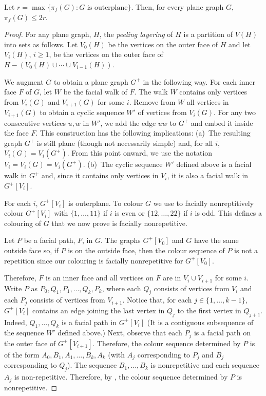 \documentclass{patmorin}
\begin{document}
\begin{thm}
   Let $r=\max\{\pi_f(G):\text{$G$ is outerplane}\}$.  Then, for every
   plane graph $G$, $\pi_f(G)\le 2r$.
\end{thm}

\begin{proof}
   For any plane graph, $H$, the \emph{peeling layering} of $H$ is
   a partition of $V(H)$ into sets as follows.  Let $V_0(H)$ be the
   vertices on the outer face of $H$ and let $V_i(H)$, $i\ge 1$, be the
   vertices on the outer face of $H-(V_0(H)\cup\cdots\cup V_{i-1}(H))$.

   We augment $G$ to obtain a plane graph $G^+$ in the following way.
   For each inner face $F$ of $G$, let $W$ be the facial walk of $F$.
   The walk $W$ contains only vertices from $V_i(G)$ and $V_{i+1}(G)$
   for some $i$.  Remove from $W$ all vertices in $V_{i+1}(G)$ to
   obtain a cyclic sequence $W'$ of vertices from $V_i(G)$.  For any
   two consecutive vertices $u,w$ in $W'$, we add the edge $uw$
   to $G^+$ and embed it inside the face $F$. This construction has
   the following implications: (a)~The resulting graph $G^+$
   is still plane (though not necessarily simple) and, for all
   $i$, $V_i(G)=V_i(G^+)$. From this point onward, we use the notation
   $V_i=V_i(G)=V_i(G^+)$.
   (b)~The cyclic sequence $W'$ defined above is a facial walk
   in $G^+$ and, since it contains only vertices in $V_i$, it is also
   a facial walk in $G^+[V_i]$.

   For each $i$, $G^+[V_i]$ is outerplane.  To colour $G$ we use
    to facially nonreptitively colour $G^+[V_i]$ with
   $\{1,\ldots,11\}$ if $i$ is even or $\{12,\ldots,22\}$ if $i$ is odd.
   This defines a colouring of $G$ that we now prove is facially
   nonrepetitive.

   Let $P$ be a facial path, $F$, in $G$. The graphs $G^+[V_0]$ and $G$
   have the same outside face so, if $P$ is on the outside face,
   then the colour sequence of $P$ is not a repetition
   since our colouring is facially nonrepetitive for $G^+[V_0]$.

   Therefore, $F$ is an inner face and all vertices on $F$ are in $V_i\cup
   V_{i+1}$ for some $i$.  Write $P$ as $P_0,Q_1,P_1,\ldots,Q_k,P_k$,
   where each $Q_j$ consists of vertices from $V_i$ and each $P_j$
   consists of vertices from $V_{i+1}$.  Notice that, for each
   $j\in\{1,\ldots,k-1\}$, $G^+[V_i]$ contains an edge joining the
   last vertex in $Q_j$ to the first vertex in $Q_{j+1}$.  Indeed,
   $Q_{1},\ldots,Q_k$ is a facial path in $G^+[V_i]$ (It is a contiguous
   subsequence of the sequence $W'$ defined above.)  Next, observe that
   each $P_j$ is a facial path on the outer face of $G^+[V_{i+1}]$.
   Therefore, the colour sequence determined by $P$ is of the form
   $A_0,B_1,A_1,\ldots,B_k,A_k$ (with $A_j$ corresponding to $P_j$
   and $B_j$ corresponding to $Q_j$).  The sequence $B_1,\ldots,B_k$ is
   nonrepetitive and each sequence $A_j$ is non-repetitive.  Therefore,
   by , the colour sequence determined by $P$
   is nonrepetitive.
\end{proof}
\end{document}
